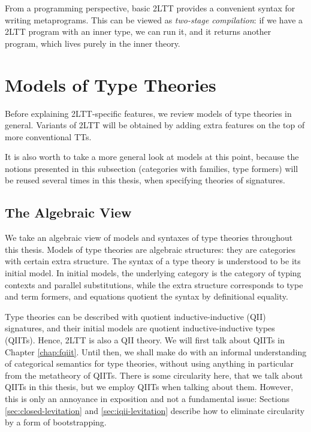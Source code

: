 \documentclass[12pt,a4paper,twoside,openany]{book}
\theoremstyle{remark}
\theoremstyle{definition}
\theoremstyle{theorem}
\begin{document}
From a programming perspective, basic 2LTT provides a convenient syntax for
writing metaprograms. This can be viewed as \emph{two-stage compilation}: if we
have a 2LTT program with an inner type, we can run it, and it returns another
program, which lives purely in the inner theory.

\section{Models of Type Theories}
\label{sec:models-of-tts}

Before explaining 2LTT-specific features, we review models of type theories
in general. Variants of 2LTT will be obtained by adding extra features on the
top of more conventional TTs.

It is also worth to take a more general look at models at this point, because
the notions presented in this subsection (categories with families, type
formers) will be reused several times in this thesis, when specifying theories
of signatures.

\subsection{The Algebraic View}

We take an algebraic view of models and syntaxes of type theories throughout
this thesis. Models of type theories are algebraic structures: they are
categories with certain extra structure. The syntax of a type theory is
understood to be its initial model. In initial models, the underlying category
is the category of typing contexts and parallel substitutions, while the extra
structure corresponds to type and term formers, and equations quotient the
syntax by definitional equality.

Type theories can be described with quotient inductive-inductive (QII)
signatures, and their initial models are quotient inductive-inductive types
(QIITs). Hence, 2LTT is also a QII theory. We will first talk about QIITs in
Chapter \ref{chap:fqiit}. Until then, we shall make do with an informal
understanding of categorical semantics for type theories, without using anything
in particular from the metatheory of QIITs. There is some circularity here, that
we talk about QIITs in this thesis, but we employ QIITs when talking about
them. However, this is only an annoyance in exposition and not a fundamental
issue: Sections \ref{sec:closed-levitation} and \ref{sec:iqii-levitation}
describe how to eliminate circularity by a form of bootstrapping.
\end{document}
